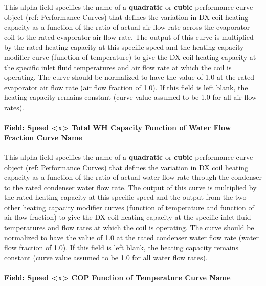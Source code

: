 This alpha field specifies the name of a \textbf{quadratic} or \textbf{cubic} performance curve object (ref: Performance Curves) that defines the variation in DX coil heating capacity as a function of the ratio of actual air flow rate across the evaporator coil to the rated evaporator air flow rate.
The output of this curve is multiplied by the rated heating capacity at this specific speed and the heating capacity modifier curve (function of temperature) to give the DX coil heating capacity at the specific inlet fluid temperatures and air flow rate at which the coil is operating. The curve should be normalized to have the value of 1.0 at the rated evaporator air flow rate (air flow fraction of 1.0).
If this field is left blank, the heating capacity remains constant (curve value assumed to be 1.0 for all air flow rates).


\paragraph{Field: Speed \textless{}x\textgreater{} Total WH Capacity Function of Water Flow Fraction Curve Name}\label{vshpwhheating-speed-x-total-wh-capacity-function-of-water-flow-fraction-curve-name}

This alpha field specifies the name of a \textbf{quadratic} or \textbf{cubic} performance curve object (ref: Performance Curves) that defines the variation in DX coil heating capacity as a function of the ratio of actual water flow rate through the condenser to the rated condenser water flow rate.
The output of this curve is multiplied by the rated heating capacity at this specific speed and the output from the two other heating capacity modifier curves (function of temperature and function of air flow fraction) to give the DX coil heating capacity at the specific inlet fluid temperatures and flow rates at which the coil is operating. The curve should be normalized to have the value of 1.0 at the rated condenser water flow rate (water flow fraction of 1.0). If this field is left blank, the heating capacity remains constant (curve value assumed to be 1.0 for all water flow rates).


\paragraph{Field: Speed \textless{}x\textgreater{} COP Function of Temperature Curve Name}\label{vshpwhheating-speed-x-cop-function-of-temperature-curve-name}

